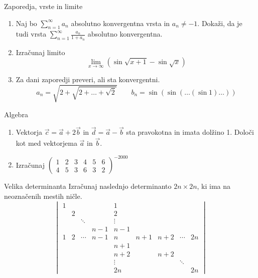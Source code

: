 \newcommand{\ZZ}{\mathbb{Z}}
\newcommand{\RR}{\mathbb{R}}
\newcommand{\CC}{\mathbb{C}}

\begin{frame}{Zaporedja, vrste in limite}
	\begin{enumerate}
		\item
		Naj bo $\sum_{n=1}^\infty a_n$ absolutno konvergentna vrsta in $a_n \ne -1$.
		Dokaži, da je tudi vrsta $\sum_{n=1}^\infty \frac{a_n}{1+a_n}$
		absolutno konvergentna.

		\item
		Izračunaj limito
		$$
		\lim_{x\rightarrow \infty} (\sin \sqrt{x+1} - \sin \sqrt{x})
		$$

		\item
		Za dani zaporedji preveri, ali sta konvergentni.
		$$
		a_n = \sqrt{2+\sqrt{2+\dots+\sqrt{2}}} \qquad b_n = \sin(\sin(\dots(\sin 1)\dots))
		$$
	\end{enumerate}
\end{frame}

\begin{frame}{Algebra}
	\begin{enumerate}
		\item
		Vektorja $\vec{c} = \vec{a} + 2\vec{b}$ in $\vec{d} = \vec{a} - \vec{b}$
		sta pravokotna in imata dolžino 1. Določi kot med vektorjema $\vec{a}$ in $\vec{b}$.
		\item 
		Izračunaj
		$\begin{pmatrix}
		1 & 2 & 3 & 4 & 5 & 6 \\
		4 & 5 & 3 & 6 & 3 & 2
		\end{pmatrix}^{-2000}$
	\end{enumerate}
\end{frame}

\begin{frame}{Velika determinanta}
	Izračunaj naslednjo determinanto $2n \times 2n$, ki ima na neoznačenih mestih ničle.
	$$\begin{vmatrix}
		1 & & & & 1 & & & & \\
		& 2 & & & 2 & & & & \\
		& & \ddots & & \vdots & & & & \\
		& & & n-1 & n-1 & & & & \\
		1 & 2 & \cdots & n-1 & n & n+1 & n+2 & \cdots & 2n \\
		& & & & n+1 & & & & \\
		& & & & n+2 & & n+2 & & \\
		& & & & \vdots & & & \ddots & \\
		& & & & 2n & & & & 2n
	\end{vmatrix}$$
\end{frame}

